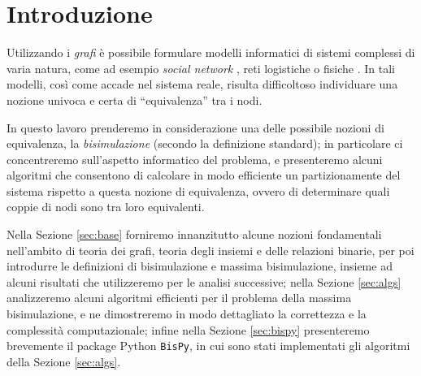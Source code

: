 \section{Introduzione}
Utilizzando i \emph{grafi} è possibile formulare modelli informatici di sistemi complessi di varia natura, come ad esempio \emph{social network} \cite{twitter}, reti logistiche \cite{supply} o fisiche \cite{electric}. In tali modelli, così come accade nel sistema reale, risulta difficoltoso individuare una nozione univoca e certa di ``equivalenza'' tra i nodi.

In questo lavoro prenderemo in considerazione una delle possibile nozioni di equivalenza, la \emph{bisimulazione} (secondo la definizione standard); in particolare ci concentreremo sull'aspetto informatico del problema, e presenteremo alcuni algoritmi che consentono di calcolare in modo efficiente un partizionamente del sistema rispetto a questa nozione di equivalenza, ovvero di determinare quali coppie di nodi sono tra loro equivalenti.

Nella Sezione \ref{sec:base} forniremo innanzitutto alcune nozioni fondamentali nell'ambito di teoria dei grafi, teoria degli insiemi e delle relazioni binarie, per poi introdurre le definizioni di bisimulazione e massima bisimulazione, insieme ad alcuni risultati che utilizzeremo per le analisi successive; nella Sezione \ref{sec:algs} analizzeremo alcuni algoritmi efficienti per il problema della massima bisimulazione, e ne dimostreremo in modo dettagliato la correttezza e la complessità computazionale; infine nella Sezione \ref{sec:bispy} presenteremo brevemente il package Python \texttt{BisPy}, in cui sono stati implementati gli algoritmi della Sezione \ref{sec:algs}.
